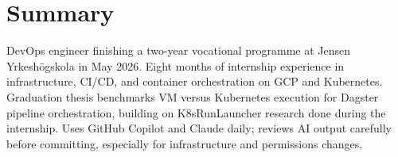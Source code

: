 \section*{Summary}

{\small\color{soft}
DevOps engineer finishing a two-year vocational programme at Jensen Yrkesh\"{o}gskola in May 2026.
Eight months of internship experience in infrastructure, CI/CD, and container orchestration on GCP and Kubernetes.
Graduation thesis benchmarks VM versus Kubernetes execution for Dagster pipeline orchestration,
building on K8sRunLauncher research done during the internship.
Uses GitHub Copilot and Claude daily; reviews AI output carefully before committing,
especially for infrastructure and permissions changes.
}


